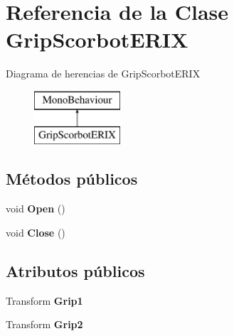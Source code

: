\hypertarget{class_grip_scorbot_e_r_i_x}{}\section{Referencia de la Clase Grip\+Scorbot\+E\+R\+IX}
\label{class_grip_scorbot_e_r_i_x}
Diagrama de herencias de Grip\+Scorbot\+E\+R\+IX\begin{figure}[H]
\begin{center}
\leavevmode
\includegraphics[height=2.000000cm]{class_grip_scorbot_e_r_i_x}
\end{center}
\end{figure}
\subsection*{Métodos públicos}
\begin{DoxyCompactItemize}
\item 
\mbox{\label{class_grip_scorbot_e_r_i_x_a0c3b7287d1a56a1e7e00228a0dbe1a34}} 
void {\bfseries Open} ()
\item 
\mbox{\label{class_grip_scorbot_e_r_i_x_a05f7c7720d01ab46bd5cd499b5f83646}} 
void {\bfseries Close} ()
\end{DoxyCompactItemize}
\subsection*{Atributos públicos}
\begin{DoxyCompactItemize}
\item 
\mbox{\label{class_grip_scorbot_e_r_i_x_a2facabd0fc50809175ecd2d6e5d96a23}} 
Transform {\bfseries Grip1}
\item 
\mbox{\label{class_grip_scorbot_e_r_i_x_adedacde16a4a9fb8a5ba5431a54beee4}} 
Transform {\bfseries Grip2}
\end{DoxyCompactItemize}
